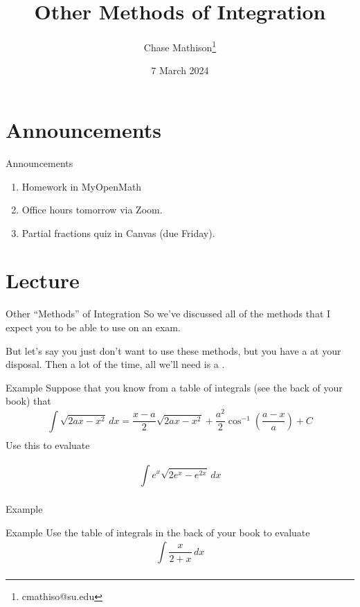 \documentclass[presentation]{beamer}
\institute[SU]{Shenandoah University}
\author{Chase Mathison\thanks{cmathiso@su.edu}}
\date{7 March 2024}
\title{Other Methods of Integration}
\begin{document}
\maketitle

\section{Announcements}
\label{sec:org3c07039}
\begin{frame}[label={sec:org14f7044}]{Announcements}
\begin{enumerate}
\item Homework in MyOpenMath
\item Office hours tomorrow via Zoom.
\item Partial fractions quiz in Canvas (due Friday).
\end{enumerate}
\end{frame}

\section{Lecture}
\label{sec:org890d77b}
\begin{frame}[label={sec:orgbb2aeb5}]{Other ``Methods'' of Integration}
So we've discussed all of the methods that I expect you to be able
to use on an exam.

But let's say you just don't want to use these methods, but you have
a \uline{\hspace*{2in}} at your disposal.  Then a lot of the time, all we'll need
is a \uline{\hspace*{1in}}.
\end{frame}

\begin{frame}[label={sec:org7e7e226}]{Example}
Suppose that you know from a table of integrals (see the back of your
book) that
\[ \int\limits_{}^{} \sqrt{2ax - x^2}\,dx = \frac{x-a}{2}
\sqrt{2ax - x^2} + \frac{a^2}{2} \cos^{-1} \left( \frac{a-x}{a}
\right) + C \]
Use this to evaluate

\[
\int\limits_{}^{} e^x\sqrt{2e^x - e^{2x}}\,dx
\]
\vspace{10in}
\end{frame}

\begin{frame}[label={sec:org303e337}]{Example}
\end{frame}

\begin{frame}[label={sec:orga886d86}]{Example}
Use the table of integrals in the back of your book to evaluate
\[
\int\limits_{}^{} \frac{x}{2 + x}\,dx
\]

\vspace{10in}
\end{frame}
\end{document}
